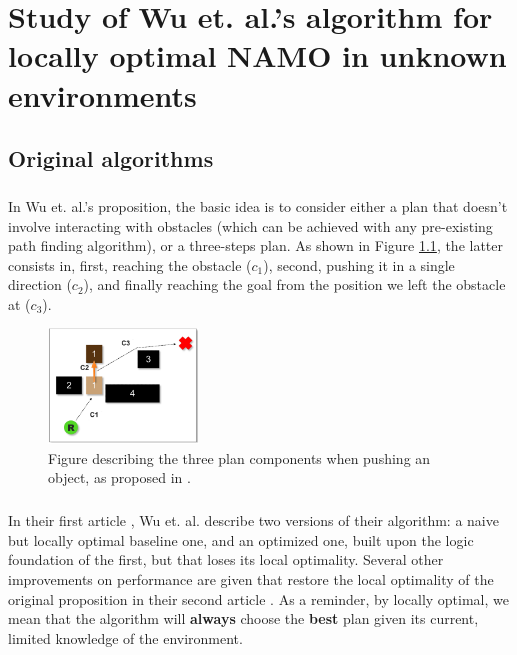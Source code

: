 
\chapter{Study of Wu et. al.'s algorithm for locally optimal NAMO in unknown environments} %

\label{Chapter3} %

\section{Original algorithms}\label{original_algo_section}

\paragraph{} In Wu et. al.'s proposition, the basic idea is to consider either a plan that doesn't involve interacting with obstacles (which can be achieved with any pre-existing path finding algorithm), or a three-steps plan. As shown in Figure \ref{fig:Wu_Original_Algorithm-wu_components_illus}, the latter consists in, first, reaching the obstacle ($c_{1}$), second, pushing it in a single direction ($c_{2}$), and finally reaching the goal from the position we left the obstacle at ($c_{3}$).

\begin{figure}[H]
\centering
\includegraphics[width=4cm]{Figures/Wu_Original_Algorithm/wu_components_illus.png}
\caption{Figure describing the three plan components when pushing an object, as proposed in \parencite{wu_navigation_2010}.}
\label{fig:Wu_Original_Algorithm-wu_components_illus}
\end{figure}

\paragraph{} In their first article \parencite{wu_navigation_2010}, Wu et. al. describe two versions of their algorithm: a naive but locally optimal baseline one, and an optimized one, built upon the logic foundation of the first, but that loses its local optimality. Several other improvements on performance are given that restore the local optimality of the original proposition in their second article \parencite{levihn_locally_2014}. As a reminder, by locally optimal, we mean that the algorithm will \textbf{always} choose the \textbf{best} plan given its current, limited knowledge of the environment.


